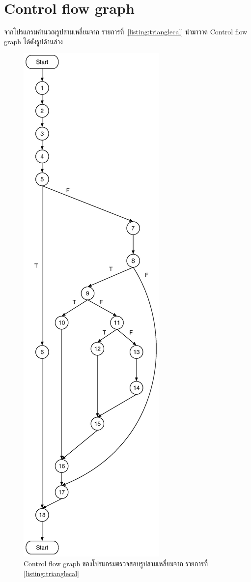 \documentclass[12pt,a4paper]{article}
\renewcommand{\lstlistingname}{รายการที่}
\begin{document}
\newpage
\section{Control flow graph}
จากโปรแกรมคำนวณรูปสามเหลี่ยมจาก \lstlistingname\, \ref{listing:trianglecal} นำมาวาด Control flow graph ได้ดังรูปด้านล่าง

\begin{figure}[h!]
    \label{fig:flowgraph}
    \centering
    \includegraphics[height=0.8\textheight]{img/graph-testing.eps}
    \caption{Control flow graph ของโปรแกรมตรวจสอบรูปสามเหลี่ยมจาก \lstlistingname\, \ref{listing:trianglecal}}
\end{figure}
\end{document}
